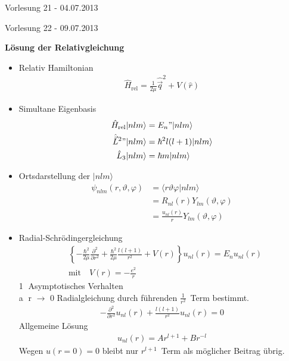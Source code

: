 \documentclass[10pt,article,colorback,accentcolor=tud9d]{scrartcl}
\begin{document}
\begin{flushright}
Vorlesung 21 - 04.07.2013
\end{flushright}

\begin{flushright}
Vorlesung 22 - 09.07.2013
\end{flushright}

\noindent\textbf{Lösung der Relativgleichung}
\begin{itemize}
	\item Relativ Hamiltonian
    \begin{align}
    \hat{H}_\text{rel}=\frac{1}{2\mu}\hat{\vec{q}}^2+V(\hat{r})
    \end{align}
  \item Simultane Eigenbasis 
    \begin{align}
    \hat{H}_\text{rel}|nlm\rangle&=E_n"|nlm\rangle\\
    \hat{\vec{L}}^2"|nlm\rangle&=\hbar^2l(l+1)|nlm\rangle\\
    \hat{L}_3|nlm\rangle&=\hbar m|nlm\rangle
    \end{align}
  \item Ortsdarstellung der $|nlm\rangle$
    \begin{align}
    \psi_{nlm}(r,\vartheta,\varphi)&=\langle r\vartheta\varphi|nlm\rangle\\
    &=R_{nl}(r)Y_{lm}(\vartheta,\varphi)\\
    &=\frac{u_{nl}(r)}{r}Y_{lm}(\vartheta,\varphi)
    \end{align}
  \item Radial-Schrödingergleichung
    \begin{align}
    &\left\{-\frac{\hbar^2}{2\mu}\frac{\partial^2}{\partial r^2}+\frac{\hbar^2}{2\mu}\frac{l(l+1)}{r^2}+V(r)\right\}u_{nl}(r)=E_nu_{nl}(r)\\
    &\text{mit}\quad V(r)=-\frac{e^2}{r}
    \end{align}
    \textcircled{1} Asymptotisches Verhalten\\
    \textcircled{a} r $\rightarrow$ 0 Radialgleichung durch führenden $\frac{1}{r^2}$~Term bestimmt.
    \begin{align}
    -\frac{\partial^2}{\partial r^2}u_{nl}(r)+\frac{l(l+1)}{r^2}u_{nl}(r)=0
    \end{align}
    Allgemeine Lösung
    \begin{align}
    u_{nl}(r)=Ar^{l+1}+Br^{-l}
    \end{align}
    Wegen $u(r=0)=0$ bleibt nur $r^{l+1}$~Term als möglicher Beitrag übrig.\\

\end{itemize}
\end{document}
